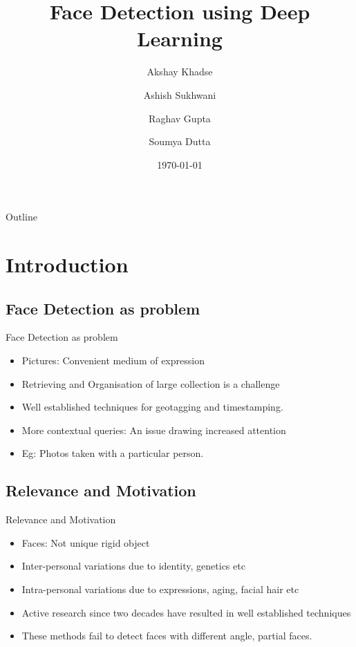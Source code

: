 \documentclass{beamer}
\title{Face Detection using Deep Learning}
\author{Akshay Khadse \and Ashish Sukhwani \and Raghav Gupta \and Soumya Dutta}
\institute[IITB] %
{
  Indian Institute of Technology\\
  Bombay
}
\date{\today}
\begin{document}
\begin{frame}
  \titlepage
\end{frame}

\begin{frame}{Outline}
  \tableofcontents
\end{frame}

\section{Introduction}

\subsection{Face Detection as problem}
\begin{frame}{Face Detection as problem}
  \begin{itemize}
  \item Pictures: Convenient medium of expression \vspace{0.75cm}
  \item Retrieving and Organisation of large collection is a challenge\vspace{0.75cm}
  \item Well established techniques for geotagging and timestamping.\vspace{0.75cm}
  \item More contextual queries: An issue drawing increased attention\vspace{0.75cm}
  \item Eg: Photos taken with a particular person.
  \end{itemize}
\end{frame}
\subsection{Relevance and Motivation}
\begin{frame}{Relevance and Motivation}
  \begin{itemize}
  \item Faces: Not unique rigid object\vspace{0.5cm}
  \item Inter-personal variations due to identity, genetics etc\vspace{0.5cm}
  \item Intra-personal variations due to expressions, aging, facial hair etc\vspace{0.5cm}
  \item Active research since two decades have resulted in well established techniques\vspace{0.5cm}
  \item These methods fail to detect faces with different angle, partial faces.
  \end{itemize}
\end{frame}
\end{document}
